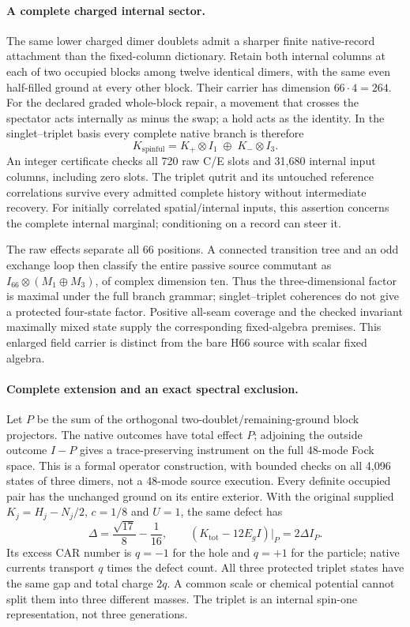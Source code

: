\paragraph{A complete charged internal sector.}
The same lower charged dimer doublets admit a sharper finite native-record
attachment than the fixed-column dictionary.  Retain both internal columns
at each of two occupied blocks among twelve identical dimers, with the same
even half-filled ground at every other block.  Their carrier has dimension
$66\cdot4=264$.  For the declared graded whole-block repair, a movement that
crosses the spectator acts internally as minus the swap; a hold acts as the
identity.  In the singlet--triplet basis every complete native branch is
therefore
\[
 K_{\mathrm{spinful}}=
 K_+\otimes I_1\;\oplus\;K_-\otimes I_3.
\]
An integer certificate checks all 720 raw C/E slots and 31,680 internal
input columns, including zero slots.  The triplet qutrit and its untouched
reference correlations survive every admitted complete history without
intermediate recovery.  For initially correlated spatial/internal inputs,
this assertion concerns the complete internal marginal; conditioning on a
record can steer it.

The raw effects separate all 66 positions.  A connected transition tree
and an odd exchange loop then classify the entire passive source commutant
as $I_{66}\otimes(M_1\oplus M_3)$, of complex dimension ten.  Thus the
three-dimensional factor is maximal under the full branch grammar;
singlet--triplet coherences do not give a protected four-state factor.
Positive all-seam coverage and the checked invariant maximally mixed state
supply the corresponding fixed-algebra premises.  This enlarged field
carrier is distinct from the bare H66 source with scalar fixed algebra.

\paragraph{Complete extension and an exact spectral exclusion.}
Let $P$ be the sum of the orthogonal two-doublet/remaining-ground block
projectors.  The native outcomes have total effect $P$; adjoining the
outside outcome $I-P$ gives a trace-preserving instrument on the full
48-mode Fock space.  This is a formal operator construction, with bounded
checks on all 4,096 states of three dimers, not a 48-mode source execution.
Every definite occupied pair has the unchanged ground on its entire
exterior.  With the original supplied $K_j=H_j-N_j/2$, $c=1/8$ and $U=1$,
the same defect has
\[
 \Delta=\frac{\sqrt{17}}8-\frac1{16},\qquad
 (K_{\mathrm{tot}}-12E_g I)|_{P}=2\Delta I_P.
\]
Its excess CAR number is $q=-1$ for the hole and $q=+1$ for the particle;
native currents transport $q$ times the defect count.  All three protected
triplet states have the same gap and total charge $2q$.  A common scale or
chemical potential cannot split them into three different masses.  The
triplet is an internal spin-one representation, not three generations.

